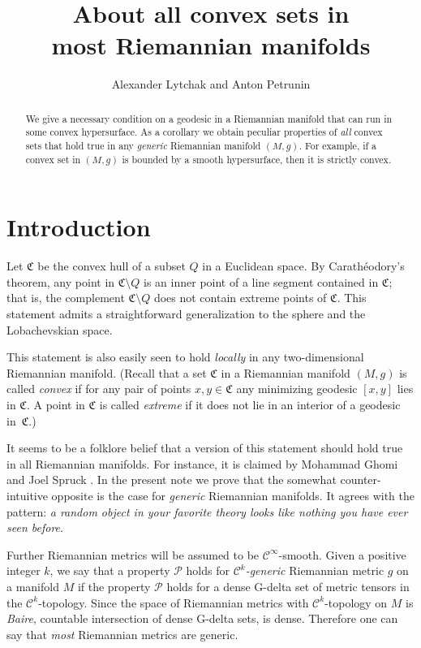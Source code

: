 \documentclass[a4paper,10pt]{article}
\def\thetitle{About all convex sets in\\ most Riemannian manifolds}
\begin{document}
\title{\thetitle}
\author{Alexander Lytchak and Anton Petrunin}
\date{}
\maketitle

\begin{abstract}
We give a necessary condition on a geodesic in a Riemannian manifold that can run in some convex hypersurface.
As a corollary we obtain peculiar properties of \emph{all} convex sets that hold true in any \emph{generic} Riemannian manifold $(M,g)$.
For example, if a convex set in $(M,g)$ is bounded by a smooth hypersurface, then it is strictly convex.
\end{abstract}

\section{Introduction}
Let $\mathfrak{C}$ be the convex hull of a subset $Q$ in a Euclidean space.
By Carathéodory's theorem, any point in $\mathfrak{C}\setminus Q$ is an inner point of a line segment contained in $\mathfrak{C}$;
that is, the complement $\mathfrak{C} \setminus Q$ does not contain extreme points of $\mathfrak{C}$.
This statement admits a straightforward generalization to the sphere and the Lobachevskian space.

This statement is also easily seen to hold \emph{locally} in any two-dimensional Riemannian manifold.
(Recall that a set $\mathfrak{C}$ in a Riemannian manifold $(M,g)$ is called \emph{convex} if for any pair of points $x,y\in \mathfrak{C}$ any minimizing geodesic $[x,y]$ lies in $\mathfrak{C}$.
A point in $\mathfrak{C}$ is called \emph{extreme} if it does not lie in an interior of a geodesic in~$\mathfrak{C}$.)

It seems to be a folklore belief that a version of this statement should hold true in all Riemannian manifolds.
For instance, it is claimed by Mohammad Ghomi and Joel Spruck \cite[Lemma 9.1]{Ghomi}.
In the present note we prove that the somewhat counter-intuitive opposite is the case for \emph{generic} Riemannian manifolds.
It agrees with the pattern: \emph{a random object in your favorite theory  looks like nothing you have ever seen before}.

Further Riemannian metrics will be assumed to be $\mathcal C^\infty$-smooth.
Given a positive integer $k$, we say that a property $\mathcal P$ holds for \emph{$\mathcal C^k$-generic} Riemannian metric $g$ on a manifold $M$ 
if the property $\mathcal P$ holds for a dense G-delta set of metric tensors in the $\mathcal C^k$-topology.
Since the space of Riemannian metrics with $\mathcal C^k$-topology on $M$ is \emph{Baire}, 
countable intersection of dense G-delta sets, is dense.
Therefore one can say that \emph{most} Riemannian metrics are generic.
\end{document}
